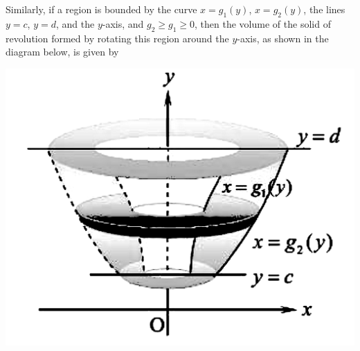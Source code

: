     Similarly, if a region is bounded by the curve $x = g_1(y)$, $x = g_2(y)$, the
    lines $y = c$, $y = d$, and the $y$-axis, and $g_2 \geq g_1 \geq 0$, then the
    volume of the solid of revolution formed by rotating this region around the
$y$-axis, as shown in the diagram below, is given by \vspace{-0.9em}
\begin{center}
\end{center}
\begin{center}
    \includegraphics[scale=0.15]{assets/28-30.png}
\end{center}





